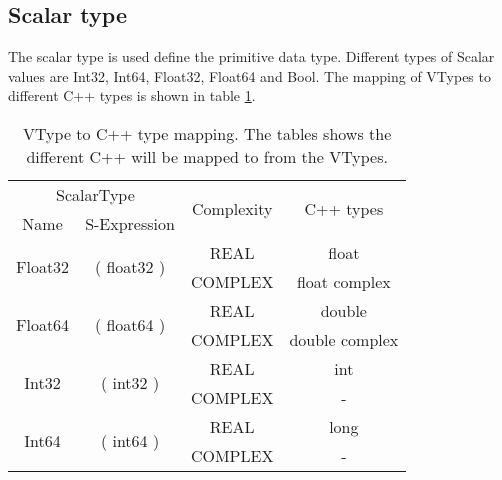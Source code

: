 \subsection{Scalar type}
The scalar type is used define the primitive data type.
Different types of Scalar values are Int32, Int64, Float32, Float64 and Bool.
The mapping of VTypes to different C++ types is shown in table \ref{tab:typeMap}.
\begin{table}[h]
\centering
\begin{tabular}{|c|c|c|c|}
\hline
\multicolumn{2}{|c|}{ScalarType}                                                                 & \multirow{2}{*}{Complexity}  & \multirow{2}{*}{C++ types} \\ \cline{1-2}
Name                                         & S-Expression                                      &                              &                            \\ \hline
\multirow{2}{*}{Float32}                     & \multicolumn{1}{c|}{\multirow{2}{*}{( float32 )}} & REAL                         & float                        \\ \cline{3-4} 
                                             & \multicolumn{1}{c|}{}                             & \multicolumn{1}{c|}{COMPLEX} & float complex              \\ \hline
\multirow{2}{*}{Float64}                     & \multicolumn{1}{c|}{\multirow{2}{*}{( float64 )}} & REAL                         & double                       \\ \cline{3-4} 
                                             & \multicolumn{1}{c|}{}                             & \multicolumn{1}{c|}{COMPLEX} & double complex             \\ \hline
\multicolumn{1}{|c|}{\multirow{2}{*}{Int32}} & \multirow{2}{*}{( int32 )}                        & REAL                         & int                      \\ \cline{3-4} 
\multicolumn{1}{|c|}{}                       &                                                   & \multicolumn{1}{c|}{COMPLEX} & -                          \\ \hline
\multicolumn{1}{|c|}{\multirow{2}{*}{Int64}} & \multirow{2}{*}{( int64 )}                        & REAL                         & long                     \\ \cline{3-4} 
\multicolumn{1}{|c|}{}                       &                                                   & \multicolumn{1}{c|}{COMPLEX} & -                          \\ \hline
\end{tabular}
\caption[VType to C++ type mapping]{VType to C++ type mapping. The tables shows the different C++ will be mapped to from the VTypes.} 
\label{tab:typeMap}
\end{table}
